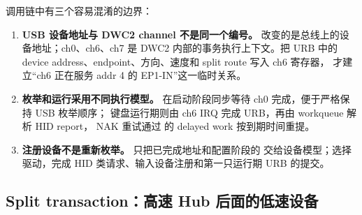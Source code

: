 调用链中有三个容易混淆的边界：
\begin{enumerate}
  \item \textbf{USB 设备地址与 DWC2 channel 不是同一个编号。}
     改变的是总线上的设备地址；ch0、ch6、ch7 是
    DWC2 内部的事务执行上下文。把 URB 中的
    device address、endpoint、方向、速度和 split route 写入 ch6 寄存器，
    才建立“ch6 正在服务 addr 4 的 EP1-IN”这一临时关系。
  \item \textbf{枚举和运行采用不同执行模型。}
    在启动阶段同步等待 ch0 完成，便于严格保持 USB 枚举顺序；
    键盘运行期则由 ch6 IRQ 完成 URB，再由 workqueue 解析 HID report，
    NAK 重试通过  的 delayed work 按到期时间重提。
  \item \textbf{注册设备不是重新枚举。}
    只把已完成地址和配置阶段的 
    交给设备模型；选择驱动，完成
    HID 类请求、输入设备注册和第一只运行期 URB 的提交。
\end{enumerate}

\subsection{Split transaction：高速 Hub 后面的低速设备}

